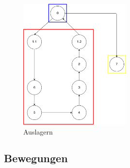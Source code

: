 %
\begin{figure}[h]
  \begin{center}
    \includegraphics[width=0.5\textwidth]{images/auslagern.png}
    \caption{Auslagern}
    \label{fig:out}
  \end{center}
\end{figure}
%
\subsection{Bewegungen}





